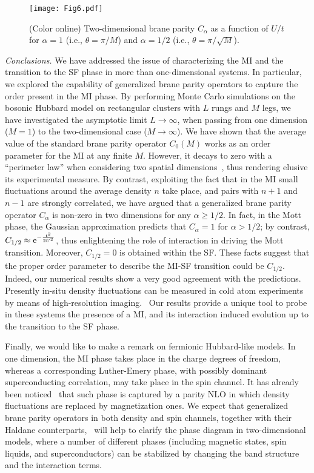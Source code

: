 \documentclass[aps,prb,floatfix,twocolumn,amsmath,amssymb]{revtex4}
\begin{document}
\begin{figure}
\texttt{[image: Fig6.pdf]}
\caption{\label{Fig:Comparison}
(Color online) Two-dimensional brane parity $C_{\alpha}$ as a function of $U/t$ for $\alpha=1$ (i.e., $\theta=\pi/M$) and $\alpha=1/2$ 
(i.e., $\theta=\pi/\sqrt{M}$).}
\end{figure}

{\it Conclusions.} We have addressed the issue of characterizing the MI and the transition to the SF phase in more than one-dimensional 
systems. In particular, we explored the capability of generalized brane parity operators to capture the order present in the MI phase. 
By performing Monte Carlo simulations on the bosonic Hubbard model on rectangular clusters with $L$ rungs and $M$ legs, we have 
investigated the asymptotic limit $L \to \infty$, when passing from one dimension ($M=1$) to the two-dimensional case ($M \to \infty$). 
We have shown that the average value of the standard brane parity operator $C_0(M)$ works as an order parameter for the MI at any finite 
$M$. However, it decays to zero with a ``perimeter law'' when considering two spatial dimensions~\cite{Rath2013}, thus rendering elusive 
its experimental measure. By contrast, exploiting the fact that in the MI small fluctuations around the average density $n$ take place, 
and pairs with $n+1$ and $n-1$ are strongly correlated, we have argued that a generalized brane parity operator $C_{\alpha}$ is non-zero 
in two dimensions for any $\alpha \geq 1/2$. In fact, in the Mott phase, the Gaussian approximation predicts that $C_\alpha=1$ for 
$\alpha > 1/2$; by contrast, $C_{1/2} \approx {\rm e}^{-\frac{t^2}{2U^2}}$, thus enlightening the role of interaction in driving the 
Mott transition. Moreover, $C_{1/2}=0$ is obtained within the SF. These facts suggest that the proper order parameter to describe the 
MI-SF transition could be $C_{1/2}$. Indeed, our numerical results show a very good agreement with the predictions.~\cite{note2} 
Presently in-situ density fluctuations can be measured in cold atom experiments by means of high-resolution imaging.~\cite{Endres2011}
Our results provide a unique tool to probe in these systems the presence of a MI, and its interaction induced evolution up to the 
transition to the SF phase.

Finally, we would like to make a remark on fermionic Hubbard-like models. In one dimension, the MI phase takes place in the charge 
degrees of freedom, whereas a corresponding Luther-Emery phase, with possibly dominant superconducting correlation, may take place in the 
spin channel. It has already been noticed~\cite{Montorsi2012} that such phase is captured by a parity NLO in which density fluctuations 
are replaced by magnetization ones. We expect that generalized brane parity operators in both density and spin channels, together with 
their Haldane counterparts,~\cite{Oshikawa1992,Barbiero2013} will help to clarify the phase diagram in two-dimensional models, where a 
number of different phases (including magnetic states, spin liquids, and superconductors) can be stabilized by changing the band 
structure and the interaction terms.
\end{document}
